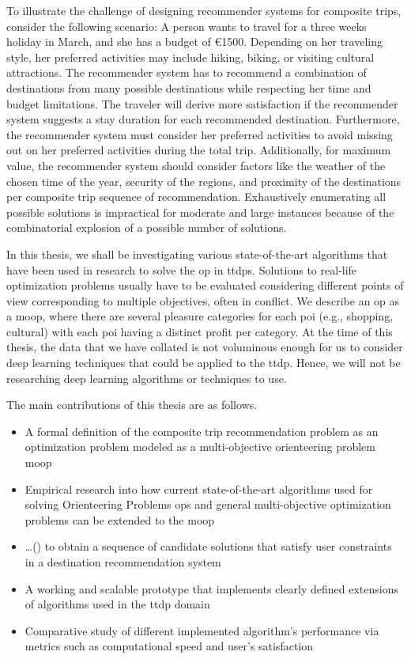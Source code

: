 To illustrate the challenge of designing recommender systems for composite trips, consider the following scenario: A person wants to travel for a three weeks holiday in March, and she has a budget of €1500. Depending on her traveling style, her preferred activities may include hiking, biking, or visiting cultural attractions. The recommender system has to recommend a combination of destinations from many possible destinations while respecting her time and budget limitations. The traveler will derive more satisfaction if the recommender system suggests a stay duration for each recommended destination. Furthermore, the recommender system must consider her preferred activities to avoid missing out on her preferred activities during the total trip. Additionally, for maximum value, the recommender system should consider factors like the weather of the chosen time of the year, security of the regions, and proximity of the destinations per composite trip sequence of recommendation. Exhaustively enumerating all possible solutions is impractical for moderate and large instances because of the combinatorial explosion of a possible number of solutions.

In this thesis, we shall be investigating various state-of-the-art algorithms that have been used in research to solve the \gls{op} in \glspl{ttdp}. Solutions to real-life optimization problems usually have to be evaluated considering different points of view corresponding to multiple objectives, often in conflict.  We describe an \gls{op} as a \gls{moop}, where there are several pleasure categories for each \gls{poi} (e.g., shopping, cultural) with each \gls{poi} having a distinct profit per category. At the time of this thesis, the data that we have collated is not voluminous enough for us to consider deep learning techniques that could be applied to the \gls{ttdp}. Hence, we will not be researching deep learning algorithms or techniques to use.

The main contributions of this thesis are as follows.

\begin{itemize}
    \item A formal definition of the composite trip recommendation problem as an optimization problem modeled as a multi-objective orienteering problem \gls{moop}
    \item Empirical research into how current state-of-the-art algorithms used for solving Orienteering Problems \glspl{op} and general multi-objective optimization problems can be extended to the \gls{moop}
    \item \ldots () to obtain a sequence of candidate solutions that satisfy user constraints in a destination recommendation system
    \item A working and scalable prototype that implements clearly defined extensions of algorithms used in the \gls{ttdp} domain
    \item Comparative study of different implemented algorithm's performance via metrics such as computational speed and user's satisfaction 
\end{itemize}


